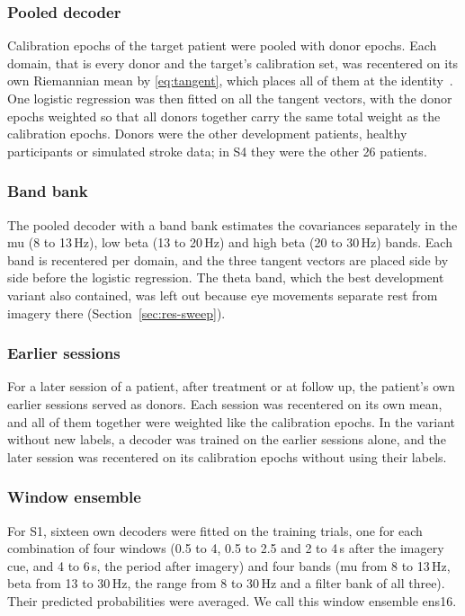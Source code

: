 \documentclass{ieeeaccess}
\begin{document}
\subsubsection{Pooled decoder} Calibration epochs of the target patient were pooled with donor epochs. Each domain, that is every donor and the target's calibration set, was recentered on its own Riemannian mean by \eqref{eq:tangent}, which places all of them at the identity~\cite{zanini2018}. One logistic regression was then fitted on all the tangent vectors, with the donor epochs weighted so that all donors together carry the same total weight as the calibration epochs. Donors were the other development patients, healthy participants or simulated stroke data; in S4 they were the other 26 patients.

\subsubsection{Band bank} The pooled decoder with a band bank estimates the covariances separately in the mu (8 to 13\,Hz), low beta (13 to 20\,Hz) and high beta (20 to 30\,Hz) bands. Each band is recentered per domain, and the three tangent vectors are placed side by side before the logistic regression. The theta band, which the best development variant also contained, was left out because eye movements separate rest from imagery there (Section~\ref{sec:res-sweep}).

\subsubsection{Earlier sessions} For a later session of a patient, after treatment or at follow up, the patient's own earlier sessions served as donors. Each session was recentered on its own mean, and all of them together were weighted like the calibration epochs. In the variant without new labels, a decoder was trained on the earlier sessions alone, and the later session was recentered on its calibration epochs without using their labels.

\subsubsection{Window ensemble} For S1, sixteen own decoders were fitted on the training trials, one for each combination of four windows (0.5 to 4, 0.5 to 2.5 and 2 to 4\,s after the imagery cue, and 4 to 6\,s, the period after imagery) and four bands (mu from 8 to 13\,Hz, beta from 13 to 30\,Hz, the range from 8 to 30\,Hz and a filter bank of all three). Their predicted probabilities were averaged. We call this window ensemble ens16.
\end{document}
